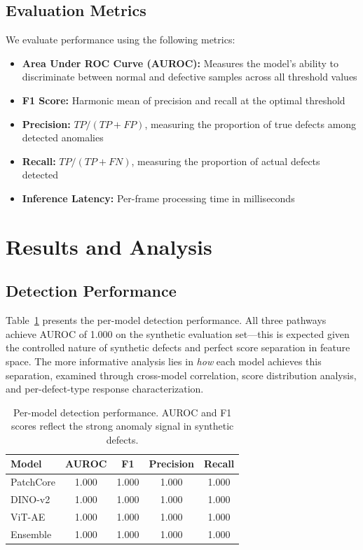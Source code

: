 \documentclass[journal]{IEEEtran}
\begin{document}
\subsection{Evaluation Metrics}

We evaluate performance using the following metrics:

\begin{itemize}[nosep]
    \item \textbf{Area Under ROC Curve (AUROC):} Measures the model's ability to discriminate between normal and defective samples across all threshold values
    \item \textbf{F1 Score:} Harmonic mean of precision and recall at the optimal threshold
    \item \textbf{Precision:} $TP / (TP + FP)$, measuring the proportion of true defects among detected anomalies
    \item \textbf{Recall:} $TP / (TP + FN)$, measuring the proportion of actual defects detected
    \item \textbf{Inference Latency:} Per-frame processing time in milliseconds
\end{itemize}

\section{Results and Analysis}
\label{sec:results}

\subsection{Detection Performance}

Table~\ref{tab:results} presents the per-model detection performance. All three pathways achieve AUROC of 1.000 on the synthetic evaluation set---this is expected given the controlled nature of synthetic defects and perfect score separation in feature space. The more informative analysis lies in \textit{how} each model achieves this separation, examined through cross-model correlation, score distribution analysis, and per-defect-type response characterization.

\begin{table}[t]
\centering
\caption{Per-model detection performance. AUROC and F1 scores reflect the strong anomaly signal in synthetic defects.}
\label{tab:results}
\begin{tabular}{lcccc}
\toprule
\textbf{Model} & \textbf{AUROC} & \textbf{F1} & \textbf{Precision} & \textbf{Recall} \\
\midrule
PatchCore & 1.000 & 1.000 & 1.000 & 1.000 \\
DINO-v2 & 1.000 & 1.000 & 1.000 & 1.000 \\
ViT-AE & 1.000 & 1.000 & 1.000 & 1.000 \\
Ensemble & 1.000 & 1.000 & 1.000 & 1.000 \\
\bottomrule
\end{tabular}
\end{table}
\end{document}
